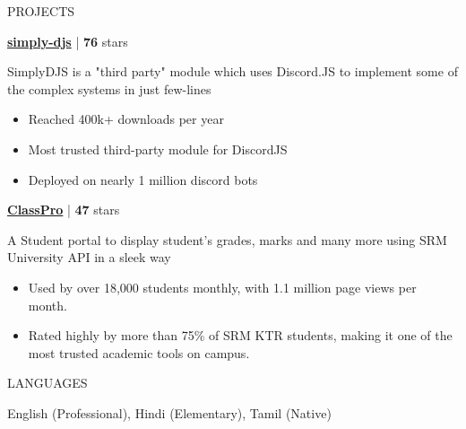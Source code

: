 \documentclass{resume}
\begin{document}
\begin{rSection}{PROJECTS}    
    \item \textbf{\href{https://github.com/Rahuletto/simply-djs}{simply-djs}} | \textbf{76} stars

SimplyDJS is a "third party" module which uses Discord.JS to implement some of the complex
systems in just few-lines

\begin{itemize}
\item Reached 400k+ downloads per year
\item Most trusted third-party module for DiscordJS
\item Deployed on nearly 1 million discord bots
\end{itemize}
\item \textbf{\href{https://github.com/Rahuletto/ClassPro}{ClassPro}} | \textbf{47} stars

A Student portal to display student's grades, marks and many more using SRM University API in a sleek way

\begin{itemize}
\item Used by over 18,000 students monthly, with 1.1 million page views per month.
\item Rated highly by more than 75\% of SRM KTR students, making it one of the most trusted academic tools on campus.
\end{itemize}

\end{rSection}
\vspace{1.5em}


\begin{rSection}{LANGUAGES}

\begin{itemize}
    English (Professional), Hindi (Elementary), Tamil (Native)
\end{itemize}

\end{rSection}



\end{document}
